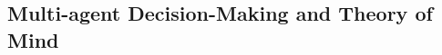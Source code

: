 \documentclass{article} %
\begin{document}



\subsection{Multi-agent Decision-Making and Theory of Mind}
\vspace{-5pt}
\end{document}

